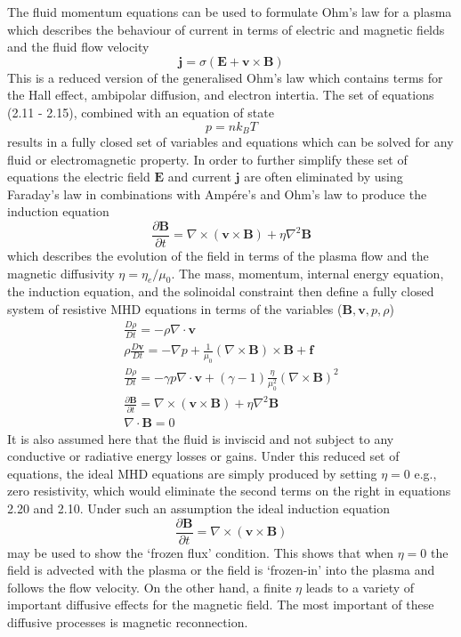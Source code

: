 The fluid momentum equations can be used to formulate Ohm's law for a plasma which describes the behaviour of current in terms of electric and magnetic fields and the fluid flow velocity
\begin{equation}
\mathbf{j} = \sigma(\mathbf{E} + \mathbf{v}\times \mathbf{B})
\end{equation}
This is a reduced version of the generalised Ohm's law which contains terms for the Hall effect, ambipolar diffusion, and electron intertia. The set of equations (2.11 - 2.15), combined with an equation of state 
\begin{equation}
p = nk_BT
\end{equation}
results in a fully closed set of variables and equations which can be solved for any fluid or electromagnetic property. In order to further simplify these set of equations the electric field $\mathbf{E}$ and current $\mathbf{j}$ are often eliminated by using Faraday's law in combinations with Amp\'{e}re's and Ohm's law to produce the induction equation
\begin{equation}
\frac{\partial \mathbf{B}}{\partial t} = \nabla \times(\mathbf{v}\times \mathbf{B}) + \eta\nabla^2 \mathbf{B}
\end{equation}
which describes the evolution of the field in terms of the plasma flow and the magnetic diffusivity $\eta = \eta_e/\mu_0$.  The mass, momentum, internal energy equation, the induction equation, and the solinoidal constraint then define  a fully closed system of resistive MHD equations in terms of the variables ($\mathbf{B}, \mathbf{v}, p, \rho$)
\begin{eqnarray}
\frac{D\rho}{Dt} = -\rho\nabla\cdot \mathbf{v} \\
\rho\frac{D\mathbf{v}}{Dt}=-\nabla p + \frac{1}{\mu_0}(\nabla \times \mathbf{B})\times \mathbf{B} + \mathbf{f} \\
\frac{D\rho}{Dt} = -\gamma p\nabla\cdot \mathbf{v} +(\gamma -1)\frac{\eta}{\mu_0^2} (\nabla \times \mathbf{B})^2 \\
\frac{\partial \mathbf{B}}{\partial t} = \nabla \times(\mathbf{v}\times \mathbf{B}) + \eta\nabla^2 \mathbf{B} \\
\nabla\cdot \mathbf{B} = 0
\end{eqnarray}
It is also assumed here that the fluid is inviscid and not subject to any conductive or radiative energy losses or gains. Under this reduced set of equations, the ideal MHD equations are simply produced by setting $\eta = 0$ e.g., zero resistivity, which would eliminate the second terms on the right in equations 2.20 and 2.10. Under such an assumption the ideal induction equation
\begin{equation}
\frac{\partial \mathbf{B}}{\partial t} = \nabla \times(\mathbf{v}\times \mathbf{B})
\end{equation}
may be used to show the \textquoteleft frozen flux' condition. This shows that when $\eta = 0$ the field is advected with the plasma or the field is \textquoteleft frozen-in' into the plasma and follows the flow velocity. On the other hand, a finite $\eta$ leads to a variety of important diffusive effects for the magnetic field. The most important of these diffusive processes is magnetic reconnection.



